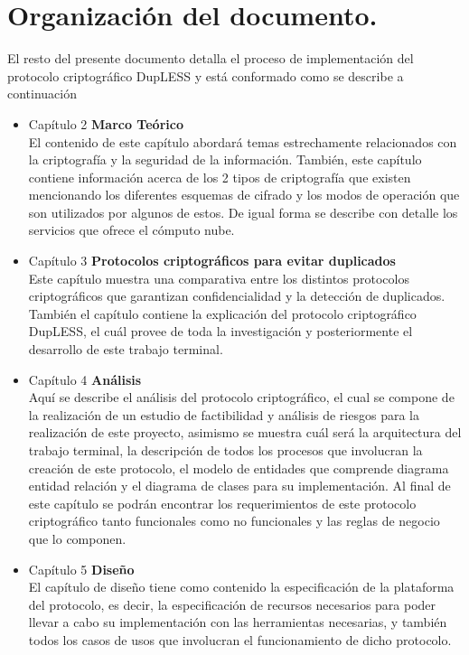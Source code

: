 \section{Organización del documento. }
El resto del presente documento detalla el proceso de implementaci\'on del protocolo criptogr\'afico DupLESS y est\'a conformado como se describe a continuaci\'on
\begin{itemize}
\item Capítulo 2 \textbf{Marco Teórico} \\
El contenido de este capítulo abordará temas estrechamente relacionados con la criptografía y la seguridad de la información. También, este capítulo contiene información acerca de los 2 tipos de criptografía que existen mencionando los diferentes esquemas de cifrado y los modos de operación que son utilizados por algunos de estos. De igual forma se describe con detalle los servicios que ofrece el cómputo nube. 

\item Capítulo 3 \textbf{Protocolos criptográficos para evitar duplicados} \\
Este cap\'itulo muestra una comparativa entre los distintos protocolos criptogr\'aficos que garantizan confidencialidad y la detecci\'on de duplicados. También el capítulo contiene la explicación del protocolo criptográfico DupLESS, el cuál provee de toda la investigación y posteriormente el desarrollo de este trabajo terminal.

\item Capítulo 4 \textbf{Análisis} \\
Aqu\'i se describe el análisis del protocolo criptográfico, el cual se compone de la realización de un estudio de factibilidad y análisis de riesgos para la realización de este proyecto, asimismo se muestra cuál será la arquitectura del trabajo terminal, la descripción de todos los procesos que involucran la creación de este protocolo, el modelo de entidades que comprende diagrama entidad relación y el diagrama de clases para su implementación. Al final de este capítulo se podrán encontrar los requerimientos de este protocolo criptográfico tanto funcionales como no funcionales y las reglas de negocio que lo componen.

\item Capítulo 5 \textbf{Diseño} \\
El capítulo de diseño tiene como contenido la especificación de la plataforma del protocolo, es decir, la especificación de recursos necesarios para poder llevar a cabo su implementación con las herramientas necesarias, y también todos los casos de usos que involucran el funcionamiento de dicho protocolo.

\end{itemize}





